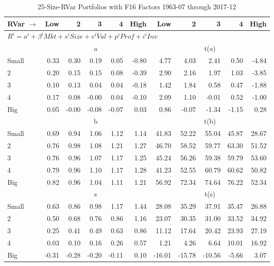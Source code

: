 
\begin{table}[!ht]
\footnotesize
\centering
\caption{25-Size-RVar Portfolios with F16 Factors 1963-07 through 2017-12}
\begin{tabular}{lrrrrrrrrrr}
  \toprule
    
    RVar $\rightarrow$ & Low & 2 & 3 & 4 & High & Low & 2 & 3 & 4 & High  \\ 
  \midrule
  \multicolumn{11}{l}{$R^i=a^i+\beta^iMkt+s^iSize+v^iVal+p^iProf+i^iInv$}  \\
  
     & \multicolumn{5}{c}{a} & \multicolumn{5}{c}{t(a)}   \\
     \cmidrule(r){2-6} \cmidrule(r){7-11} 
    Small  & 0.33  & 0.30  & 0.19  & 0.05  & -0.80  & 4.77  & 4.03  & 2.41  & 0.50  & -4.84   \\
    2  & 0.20  & 0.15  & 0.15  & 0.08  & -0.39  & 2.90  & 2.16  & 1.97  & 1.03  & -3.85   \\
    3  & 0.10  & 0.13  & 0.04  & 0.04  & -0.18  & 1.42  & 1.84  & 0.58  & 0.47  & -1.88   \\
    4  & 0.17  & 0.08  & -0.00  & 0.04  & -0.10  & 2.09  & 1.10  & -0.01  & 0.52  & -1.00   \\
    Big  & 0.05  & -0.00  & -0.08  & -0.07  & 0.03  & 0.86  & -0.07  & -1.34  & -1.15  & 0.28   \\
    
  
     & \multicolumn{5}{c}{b} & \multicolumn{5}{c}{t(b)}   \\
     \cmidrule(r){2-6} \cmidrule(r){7-11} 
    Small  & 0.69  & 0.94  & 1.06  & 1.12  & 1.14  & 41.83  & 52.22  & 55.04  & 45.87  & 28.67   \\
    2  & 0.76  & 0.98  & 1.08  & 1.21  & 1.27  & 46.70  & 58.52  & 59.77  & 63.30  & 51.52   \\
    3  & 0.76  & 0.96  & 1.07  & 1.17  & 1.25  & 45.24  & 56.26  & 59.38  & 59.79  & 53.60   \\
    4  & 0.79  & 0.96  & 1.10  & 1.17  & 1.28  & 41.23  & 52.55  & 60.79  & 60.62  & 50.82   \\
    Big  & 0.82  & 0.96  & 1.04  & 1.11  & 1.21  & 56.92  & 72.34  & 74.64  & 76.22  & 52.34   \\
    
  
     & \multicolumn{5}{c}{s} & \multicolumn{5}{c}{t(s)}   \\
     \cmidrule(r){2-6} \cmidrule(r){7-11} 
    Small  & 0.63  & 0.86  & 0.98  & 1.17  & 1.44  & 28.08  & 35.29  & 37.91  & 35.47  & 26.88   \\
    2  & 0.50  & 0.68  & 0.76  & 0.86  & 1.16  & 23.07  & 30.35  & 31.00  & 33.52  & 34.92   \\
    3  & 0.25  & 0.41  & 0.49  & 0.63  & 0.86  & 11.12  & 17.64  & 20.42  & 23.93  & 27.19   \\
    4  & 0.03  & 0.10  & 0.16  & 0.26  & 0.57  & 1.21  & 4.26  & 6.64  & 10.01  & 16.92   \\
    Big  & -0.31  & -0.28  & -0.20  & -0.11  & 0.10  & -16.01  & -15.78  & -10.56  & -5.66  & 3.07   \\
    

\end{tabular}
\end{table}
